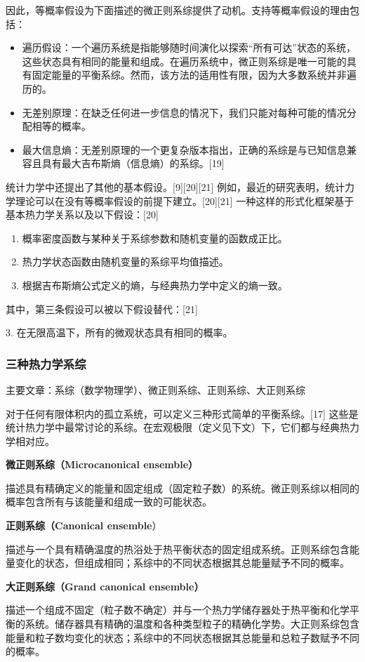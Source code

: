 因此，等概率假设为下面描述的微正则系综提供了动机。支持等概率假设的理由包括：
\begin{itemize}
\item 遍历假设：一个遍历系统是指能够随时间演化以探索“所有可达”状态的系统，这些状态具有相同的能量和组成。在遍历系统中，微正则系综是唯一可能的具有固定能量的平衡系综。然而，该方法的适用性有限，因为大多数系统并非遍历的。
\item 无差别原理：在缺乏任何进一步信息的情况下，我们只能对每种可能的情况分配相等的概率。
\item 最大信息熵：无差别原理的一个更复杂版本指出，正确的系综是与已知信息兼容且具有最大吉布斯熵（信息熵）的系综。[19] 
\end{itemize}
统计力学中还提出了其他的基本假设。[9][20][21] 例如，最近的研究表明，统计力学理论可以在没有等概率假设的前提下建立。[20][21] 一种这样的形式化框架基于基本热力学关系以及以下假设：[20]  
\begin{enumerate}
\item 概率密度函数与某种关于系综参数和随机变量的函数成正比。  
\item 热力学状态函数由随机变量的系综平均值描述。  
\item 根据吉布斯熵公式定义的熵，与经典热力学中定义的熵一致。 
\end{enumerate} 
其中，第三条假设可以被以下假设替代：[21]  

3. 在无限高温下，所有的微观状态具有相同的概率。  
\subsubsection{三种热力学系综}
主要文章：系综（数学物理学）、微正则系综、正则系综、大正则系综  

对于任何有限体积内的孤立系统，可以定义三种形式简单的平衡系综。[17] 这些是统计热力学中最常讨论的系综。在宏观极限（定义见下文）下，它们都与经典热力学相对应。  

\textbf{微正则系综（Microcanonical ensemble）}

描述具有精确定义的能量和固定组成（固定粒子数）的系统。微正则系综以相同的概率包含所有与该能量和组成一致的可能状态。  

\textbf{正则系综（Canonical ensemble}）

描述与一个具有精确温度的热浴处于热平衡状态的固定组成系统。正则系综包含能量变化的状态，但组成相同；系综中的不同状态根据其总能量赋予不同的概率。  

\textbf{大正则系综（Grand canonical ensemble）} 

描述一个组成不固定（粒子数不确定）并与一个热力学储存器处于热平衡和化学平衡的系统。储存器具有精确的温度和各种类型粒子的精确化学势。大正则系综包含能量和粒子数均变化的状态；系综中的不同状态根据其总能量和总粒子数赋予不同的概率。  


